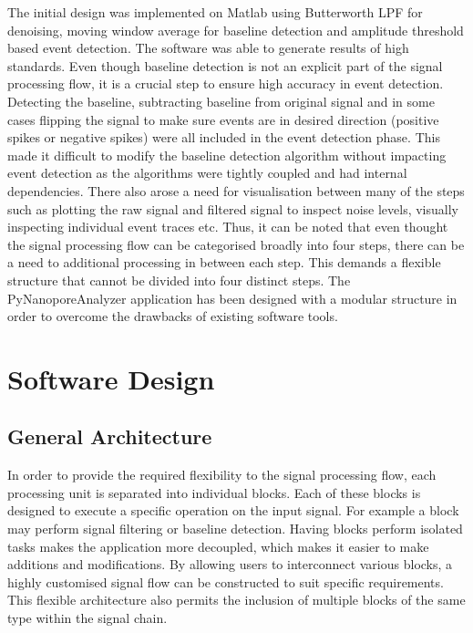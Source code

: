 \documentclass[journal]{IEEEtran}
\begin{document}
The initial design was implemented on Matlab using Butterworth LPF for denoising, moving window average for baseline detection and amplitude threshold based event detection. The software was able to generate results of high standards. Even though baseline detection is not an explicit part of the signal processing flow, it is a crucial step to ensure high accuracy in event detection. Detecting the baseline, subtracting baseline from original signal and in some cases flipping the signal to make sure events are in desired direction (positive spikes or negative spikes) were all included in the event detection phase. This made it difficult to modify the baseline detection algorithm without impacting event detection as the algorithms were tightly coupled and had internal dependencies. There also arose a need for visualisation between many of the steps such as plotting the raw signal and filtered signal to inspect noise levels, visually inspecting individual event traces etc. Thus, it can be noted that even thought the signal processing flow can be categorised broadly into four steps, there can be a need to additional processing in between each step. This demands a flexible structure that cannot be divided into four distinct steps. The PyNanoporeAnalyzer application has been designed with a modular structure in order to overcome the drawbacks of existing software tools.

\section{Software Design}
\subsection{General Architecture}
In order to provide the required flexibility to the signal processing flow, each processing unit is separated into individual blocks. Each of these blocks is designed to execute a specific operation on the input signal. For example a block may perform signal filtering or baseline detection. Having blocks perform isolated tasks makes the application more decoupled, which makes it easier to make additions and modifications. By allowing users to interconnect various blocks, a highly customised signal flow can be constructed to suit specific requirements. This flexible architecture also permits the inclusion of multiple blocks of the same type within the signal chain. 
\end{document}
